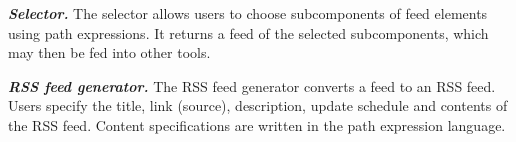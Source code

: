 \textbf{\textit{Selector.}} The selector allows users to choose
subcomponents of feed elements using path expressions. It returns a
feed of the selected subcomponents, which may then be fed into other
tools. 


\textbf{\textit{RSS feed generator.}} The RSS feed generator converts a
\padsd{} feed to an RSS feed. Users specify the title, link (source),
description, update schedule and contents of the RSS feed.  Content
specifications are written in the path expression language.




